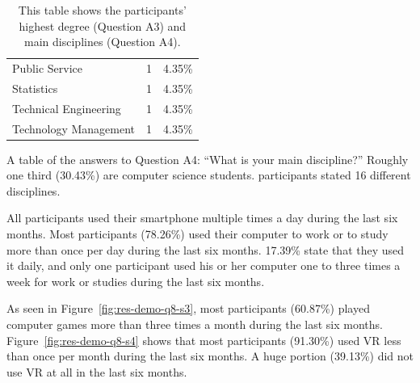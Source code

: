 \begin{table}[H]
\begin{subtable}[b]{.48\textwidth}
\begin{tabular}[b]{l c c}
			Public Service          & 1     & 4.35\%     \\
			Statistics              & 1     & 4.35\%     \\
			Technical Engineering   & 1     & 4.35\%     \\
			Technology Management   & 1     & 4.35\%     \\
			\bottomrule
		\end{tabular}
		\caption{A table of the answers to Question A4: \enquote{What is your main discipline?} Roughly one third (30.43\%) are computer science students. \participantsCount{} participants stated 16 different disciplines.}\label{tab:sus-discipline}
	\end{subtable}
	\caption[Degree and discipline of participants]{This table shows the participants' highest degree (Question A3) and main disciplines (Question A4).}\label{tab:sus-d}
\end{table}

All participants used their smartphone multiple times a day during the last six months. Most participants (78.26\%) used their computer to work or to study more than once per day during the last six months. 17.39\% state that they used it daily, and only one participant used his or her computer one to three times a week for work or studies during the last six months.

As seen in Figure~\ref{fig:res-demo-q8-s3}, most participants (60.87\%) played computer games more than three times a month during the last six months. Figure~\ref{fig:res-demo-q8-s4} shows that most participants (91.30\%) used \gls{VR} less than once per month during the last six months. A huge portion (39.13\%) did not use \gls{VR} at all in the last six months.

